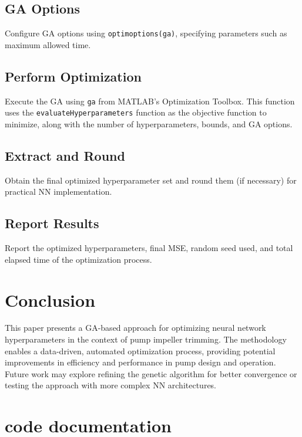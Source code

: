\documentclass[
  super,
  review,
  3p]{elsarticle}
\begin{document}
\subsection{GA Options}\label{ga-options}

Configure GA options using
\texttt{optimoptions(\textquotesingle{}ga\textquotesingle{})},
specifying parameters such as maximum allowed time.

\subsection{Perform Optimization}\label{perform-optimization}

Execute the GA using \texttt{ga} from MATLAB's Optimization Toolbox.
This function uses the \texttt{evaluateHyperparameters} function as the
objective function to minimize, along with the number of
hyperparameters, bounds, and GA options.

\subsection{Extract and Round}\label{extract-and-round}

Obtain the final optimized hyperparameter set and round them (if
necessary) for practical NN implementation.

\subsection{Report Results}\label{report-results}

Report the optimized hyperparameters, final MSE, random seed used, and
total elapsed time of the optimization process.

\section{Conclusion}\label{conclusion}

This paper presents a GA-based approach for optimizing neural network
hyperparameters in the context of pump impeller trimming. The
methodology enables a data-driven, automated optimization process,
providing potential improvements in efficiency and performance in pump
design and operation. Future work may explore refining the genetic
algorithm for better convergence or testing the approach with more
complex NN architectures.

\section{code documentation}\label{code-documentation}
\end{document}
